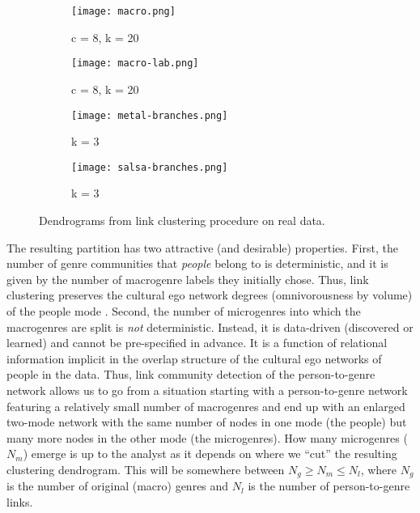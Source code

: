 \documentclass[a4paper,12pt]{article}
\begin{document}
\begin{figure}[t!]
     \begin{subfigure}[b]{0.5\textwidth}
        \centering
        \texttt{[image: macro.png]}
        \caption{c = 8, k = 20}
        \label{fig:dend-macro}
    \end{subfigure} 
     \begin{subfigure}[b]{0.5\textwidth}
        \centering
        \texttt{[image: macro-lab.png]}
        \caption{c = 8, k = 20}
        \label{fig:dend-macro-labels}
    \end{subfigure} 
     \begin{subfigure}[b]{0.5\textwidth}
        \centering
        \texttt{[image: metal-branches.png]}
        \caption{k = 3}
        \label{fig:dend-micro-metal}
    \end{subfigure}
     \begin{subfigure}[b]{0.5\textwidth}
        \centering
        \texttt{[image: salsa-branches.png]}
        \caption{k = 3}
        \label{fig:dend-micro-salsa}
    \end{subfigure}
    \caption{Dendrograms from link clustering procedure on real data.}
    \label{fig:dend}
 \end{figure}
 
The resulting partition has two attractive (and desirable) properties. First, the number of genre communities that \textit{people} belong to is deterministic, and it is given by the number of macrogenre labels they initially chose. Thus, link clustering preserves the cultural ego network degrees (omnivorousness by volume) of the people mode \citep{lizardo14}. Second, the number of microgenres into which the macrogenres are split is {\em not} deterministic. Instead, it is data-driven (discovered or learned) and cannot be pre-specified in advance. It is a function of relational information implicit in the overlap structure of the cultural ego networks of people in the data. Thus, link community detection of the person-to-genre network allows us to go from a situation starting with a person-to-genre network featuring a relatively small number of macrogenres and end up with an enlarged two-mode network with the same number of nodes in one mode (the people) but many more nodes in the other mode (the microgenres). How many microgenres ($N_m$) emerge is up to the analyst as it depends on where we ``cut'' the resulting clustering dendrogram. This will be somewhere between $N_g \geq N_m \leq N_l$, where $N_g$ is the number of original (macro) genres and $N_l$ is the number of person-to-genre links.
\end{document}
